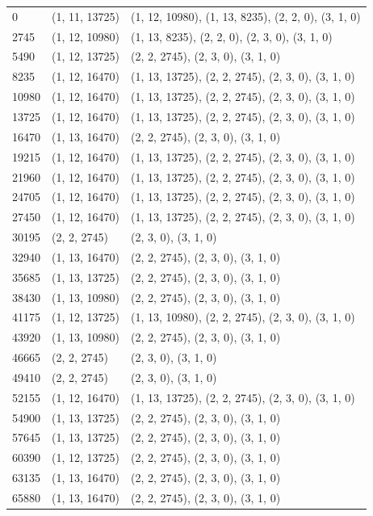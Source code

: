 \documentclass{utmthesis}
\begin{document}
\begin{center}
\begin{longtable}{|l|l|l|}
0 & (1, 11, 13725) & (1, 12, 10980), (1, 13, 8235), (2, 2, 0), (3, 1, 0) \\
2745 & (1, 12, 10980) & (1, 13, 8235), (2, 2, 0), (2, 3, 0), (3, 1, 0) \\
5490 & (1, 12, 13725) & (2, 2, 2745), (2, 3, 0), (3, 1, 0) \\
8235 & (1, 12, 16470) & (1, 13, 13725), (2, 2, 2745), (2, 3, 0), (3, 1, 0) \\
10980 & (1, 12, 16470) & (1, 13, 13725), (2, 2, 2745), (2, 3, 0), (3, 1, 0) \\
13725 & (1, 12, 16470) & (1, 13, 13725), (2, 2, 2745), (2, 3, 0), (3, 1, 0) \\
16470 & (1, 13, 16470) & (2, 2, 2745), (2, 3, 0), (3, 1, 0) \\
19215 & (1, 12, 16470) & (1, 13, 13725), (2, 2, 2745), (2, 3, 0), (3, 1, 0) \\
21960 & (1, 12, 16470) & (1, 13, 13725), (2, 2, 2745), (2, 3, 0), (3, 1, 0) \\
24705 & (1, 12, 16470) & (1, 13, 13725), (2, 2, 2745), (2, 3, 0), (3, 1, 0) \\
27450 & (1, 12, 16470) & (1, 13, 13725), (2, 2, 2745), (2, 3, 0), (3, 1, 0) \\
30195 & (2, 2, 2745) & (2, 3, 0), (3, 1, 0) \\
32940 & (1, 13, 16470) & (2, 2, 2745), (2, 3, 0), (3, 1, 0) \\
35685 & (1, 13, 13725) & (2, 2, 2745), (2, 3, 0), (3, 1, 0) \\
38430 & (1, 13, 10980) & (2, 2, 2745), (2, 3, 0), (3, 1, 0) \\
41175 & (1, 12, 13725) & (1, 13, 10980), (2, 2, 2745), (2, 3, 0), (3, 1, 0) \\
43920 & (1, 13, 10980) & (2, 2, 2745), (2, 3, 0), (3, 1, 0) \\
46665 & (2, 2, 2745) & (2, 3, 0), (3, 1, 0) \\
49410 & (2, 2, 2745) & (2, 3, 0), (3, 1, 0) \\
52155 & (1, 12, 16470) & (1, 13, 13725), (2, 2, 2745), (2, 3, 0), (3, 1, 0) \\
54900 & (1, 13, 13725) & (2, 2, 2745), (2, 3, 0), (3, 1, 0) \\
57645 & (1, 13, 13725) & (2, 2, 2745), (2, 3, 0), (3, 1, 0) \\
60390 & (1, 12, 13725) & (2, 2, 2745), (2, 3, 0), (3, 1, 0) \\
63135 & (1, 13, 16470) & (2, 2, 2745), (2, 3, 0), (3, 1, 0) \\
65880 & (1, 13, 16470) & (2, 2, 2745), (2, 3, 0), (3, 1, 0) \\

\end{longtable}
\end{center}
\end{document}
